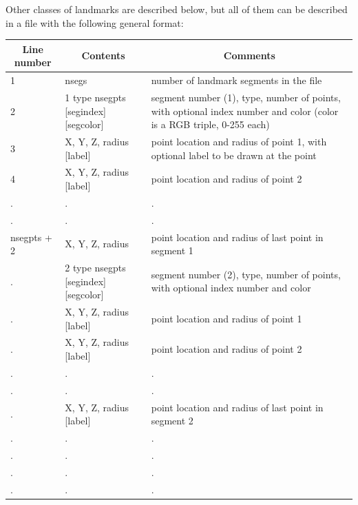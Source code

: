   Other classes of landmarks are described below, but all of them can be
  described in a file with the following general format:
  \begin{center}
  \begin{tabular}{|l|l|p{3.0in}|}
  \hline
  \multicolumn{1}{|c|}{Line number} &
  \multicolumn{1}{|c|}{Contents} &
  \multicolumn{1}{|c|}{Comments} \\ \hline
  1 & nsegs   & number of landmark segments in the file \\ \hline
  2 & 1 type nsegpts [segindex] [segcolor] & segment number (1), type, number of
  points, with optional index number and color (color is a RGB triple, 0-255 each) \\ 
  3 & X, Y, Z, radius [label] & point location and radius of point 1, with optional label to be drawn at the point \\
  4 & X, Y, Z, radius [label] & point location and radius of point 2 \\
  . & . & . \\
  . & . & . \\
  nsegpts + 2 & X, Y, Z, radius & point location and radius of last point in
                              segment 1 \\ \hline
  . & 2 type nsegpts [segindex] [segcolor] & segment number (2), type, number of
  points, with optional index number and color \\ 
  . & X, Y, Z, radius [label] & point location and radius of point 1 \\
  . & X, Y, Z, radius [label] & point location and radius of point 2 \\
  . & . & . \\
  . & . & . \\
  . & X, Y, Z, radius [label] & point location and radius of last point in
                              segment 2 \\ \hline
  . & . & . \\
  . & . & . \\
  . & . & . \\
  . & . & . \\
  \hline
  \end{tabular}
  \end{center}


